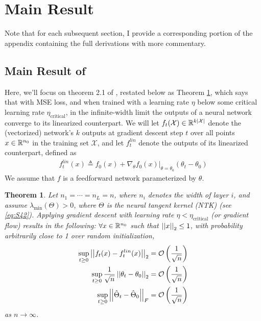 \documentclass{article}
\newtheorem{theorem}{Theorem}[section]
\newcommand\mc{\mathcal}
\begin{document}
\section{Main Result}

Note that for each subsequent section, I provide a corresponding portion of the appendix containing the full derivations with more commentary. 

\subsection{Main Result of \cite{lee2019}}

Here, we'll focus on theorem 2.1 of \cite{lee2019}, restated below as Theorem \ref{thm:lee-2.1}, which says that with MSE loss, and when trained with a learning rate $\eta$ below some critical learning rate $\eta_{\text{critical}}$, in the infinite-width limit the outputs of a neural network converge to its linearized counterpart. We will let $f_t(\mc X) \in \R^{k|\mc X|}$ denote the (vectorized) network's $k$ outputs  at gradient descent step $t$ over all points $x \in \mathbb{R}^{n_0}$ in the training set $\mc X$, and let $f^{lin}_t$ denote the outputs of its linearized counterpart, defined as 
\begin{align}
	f^{lin}_t(x) \triangleq f_0(x) + \nabla_{\theta}f_0(x) \big|_{\theta=\theta_0} (\theta_t - \theta_0) 
\end{align}
We assume that $f$ is a feedforward network parameterized by $\theta$. 

\renewcommand{\d}{\mgray{\delta_0}}
\renewcommand{\r}{\mred{R_0}}
\newcommand{\n}{\mblue{n_0}}
\renewcommand{\k}{\mpurple{K}}
\renewcommand{\c}{\morange{C}}

\begin{theorem}\label{thm:lee-2.1}
	Let $n_1 = \cdots = n_L = n$, where $n_i$ denotes the width of layer $i$, and assume $\lambda_{\text{min}}(\Theta) > 0$, where $\Theta$ is the neural tangent kernel (NTK) (see \ref{eq:S42}). Applying gradient descent with learning rate $\eta < \eta_{\text{critical}}$ (or gradient flow) results in the following: $\forall x \in \mathbb{R}^{n_0}$ such that $\left|\left| x \right|\right|_{2} \leq 1$, with probability arbitrarily close to 1 over random initialization,
	\begin{align}
		\sup_{t \geq 0} \norm{f_t(x) - f^{lin}_t(x)} 
			&= \mc O\lr{ \inv{\sqrt{n}} } \label{eq:lee-2.1-1}  \\
		\sup_{t \geq 0} \inv{\sqrt{n}} \norm{\theta_t - \theta_0} 
			&= \mc O\lr{ \inv{\sqrt{n}} } \label{eq:lee-2.1-2}  \\
		\sup_{t \geq 0} \norm[F]{\hat\Theta_t - \hat\Theta_0}
			&=  \mc O\lr{ \inv{\sqrt{n}} } \label{eq:lee-2.1-3}
	\end{align}
	as $n \to \infty$.
\end{theorem}
\end{document}
